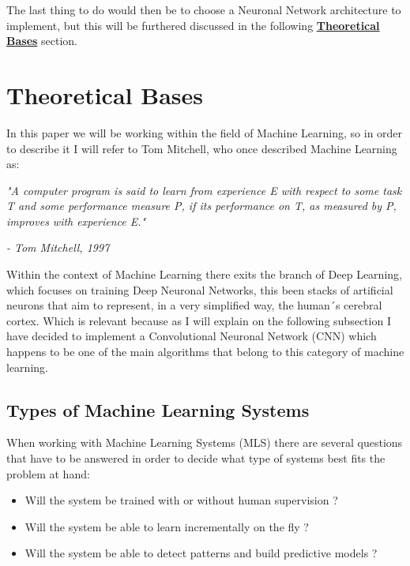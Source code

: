 \documentclass[12pt, a4paper]{article}
\begin{document}
	The last thing to do would then be to choose a Neuronal Network architecture to implement, but this will be furthered discussed in the following \hyperref[sec:TheoreticalBases]{\textbf{Theoretical Bases}} section.
	
	\clearpage
	
	\section{Theoretical Bases}
	\label{sec:TheoreticalBases}
	
	In this paper we will be working within the field of Machine Learning, so in order to describe it I will refer to Tom Mitchell, who once described Machine Learning as: 
	
	\textit{"A computer program is said to learn from experience E with respect to some task T and some performance measure P, if its performance on T, as measured by P, improves with experience E."}
	\begin{flushright}
		\textit{- Tom Mitchell, 1997 \cite{handsonmachinelearning}}
	\end{flushright}
	
	Within the context of Machine Learning there exits the branch of Deep Learning, which focuses on training Deep Neuronal Networks, this been stacks of artificial neurons that aim to represent, in a very simplified way, the human´s cerebral cortex. Which is relevant because as I will explain on the following subsection I have decided to implement a Convolutional Neuronal Network (CNN) which happens to be one of the main algorithms that belong to this category of machine learning.
	
	
	\clearpage
	
	\subsection{Types of Machine Learning Systems }
	
	When working with Machine Learning Systems (MLS) there are several questions that have to be answered in order to decide what type of systems best fits the problem at hand: \cite{handsonmachinelearning}
	
	\begin{itemize}
		
		\item Will the system be trained with or without human supervision ?
		
		\item Will the system be able to learn incrementally on the fly ?
		
		\item Will the system be able to detect patterns and build predictive models ?
		
	\end{itemize}
	
\end{document}
